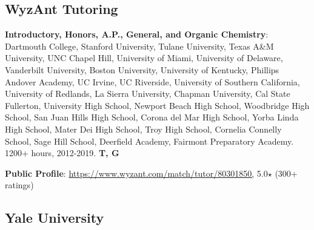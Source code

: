 \documentclass[10pt]{article}
\newcommand*\teitem[4]{\textbf{#1}: #2 #3 \textbf{#4}}
\begin{document}

\subsection{WyzAnt Tutoring}


\teitem{Introductory, Honors, A.P., General, and Organic Chemistry}{Dartmouth College, Stanford University, Tulane University, Texas A\&M University, UNC Chapel Hill, University of Miami, University of Delaware, Vanderbilt University, Boston University, University of Kentucky, Phillips Andover Academy, UC Irvine, UC Riverside, University of Southern California, University of Redlands, La Sierra University, Chapman University, Cal State Fullerton, %
University High School, Newport Beach High School, Woodbridge High School, San Juan Hills High School, Corona del Mar High School, Yorba Linda High School, Mater Dei High School, Troy High School, Cornelia Connelly School, Sage Hill School, Deerfield Academy, Fairmont Preparatory Academy.}{1200+ hours, 2012-2019.}{T, G} 

\teitem{Public Profile}{\href{https://www.wyzant.com/match/tutor/80301850}{https://www.wyzant.com/match/tutor/80301850,}}{5.0$\star$ (300+ ratings)}{}


\subsection{Yale University}

\end{document}

